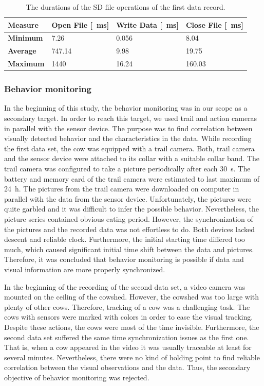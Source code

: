 \documentclass[english,12pt,a4paper,pdftex,elec,utf8]{aaltothesis}
\begin{document}
\begin{table} \caption{The durations of the SD file operations of the first data record.} \label{fileoperationstable}
\centering
\begin{tabular}{| p{2.75cm} | p{3cm} | p{3cm} | p{3cm} |}
\hline
\textbf{Measure} & \textbf{Open File} [\SI{}{\milli\second}] & \textbf{Write Data} [\SI{}{\milli\second}] & \textbf{Close File} [\SI{}{\milli\second}] \\  \hline
\textbf{Minimum} & 7.26 & 0.056 & 8.04 \\ \hline
\textbf{Average} & 747.14 & 9.98 & 19.75 \\ \hline
\textbf{Maximum} & 1440 & 16.24 & 160.03 \\ \hline
\end{tabular}
\end{table}



\subsubsection{Behavior monitoring}

In the beginning of this study, the behavior monitoring was in our scope as a secondary target. In order to reach this target, we used trail and action cameras in parallel with the sensor device. The purpose was to find correlation between visually detected behavior and the characteristics in the data. While recording the first data set, the cow was equipped with a trail camera. Both, trail camera and the sensor device were attached to its collar with a suitable collar band. The trail camera was configured to take a picture periodically after each \SI{30}{\second}. The battery and memory card of the trail camera were estimated to last maximum of \SI{24}{\hour}. The pictures from the trail camera were downloaded on computer in parallel with the data from the sensor device. Unfortunately, the pictures were quite garbled and it was difficult to infer the possible behavior. Nevertheless, the picture series contained obvious eating period. However, the synchronization of the pictures and the recorded data was not effortless to do. Both devices lacked descent and reliable clock. Furthermore, the initial starting time differed too much, which caused significant initial time shift between the data and pictures. Therefore, it was concluded that behavior monitoring is possible if data and visual information are more properly synchronized.

In the beginning of the recording of the second data set, a video camera was mounted on the ceiling of the cowshed. However, the cowshed was too large with plenty of other cows. Therefore, tracking of a cow was a challenging task. The cows with sensors were marked with colors in order to ease the visual tracking. Despite these actions, the cows were most of the time invisible. Furthermore, the second data set suffered the same time synchronization issues as the first one. That is, when a cow appeared in the video it was usually traceable at least for several minutes. Nevertheless, there were no kind of holding point to find reliable correlation between the visual observations and the data. Thus, the secondary objective of behavior monitoring was rejected.
\end{document}
